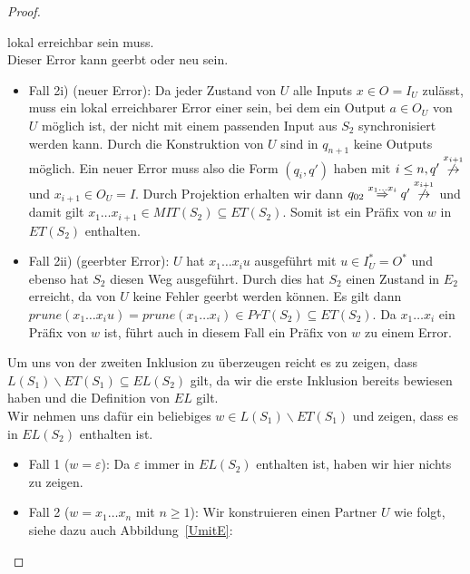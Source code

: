 \begin{proof}
\begin{itemize}
      lokal erreichbar sein muss.\\
      Dieser Error kann geerbt oder neu sein.\\
      \begin{itemize}
        \item Fall 2i) (neuer Error): Da jeder Zustand von $U$ alle Inputs $x\in
          O=I_U$ zulässt, muss ein lokal erreichbarer Error einer sein, bei dem
          ein Output $a\in O_U$ von $U$ möglich ist, der nicht mit einem
          passenden Input aus $S_2$ synchronisiert werden kann. Durch die
          Konstruktion von $U$ sind in $q_{n+1}$ keine Outputs möglich. Ein
          neuer Error muss also die Form $(q_i,q')$ haben mit $i\leq n, q'
          \overset{x_{i+1}}{\not{\hspace{-0.1cm}\rightarrow}}$ und $x_{i+1}\in
          O_U=I$. Durch Projektion erhalten wir dann $q_{02} \overset{x_1\dots
          x_i}{\Rightarrow} q'
          \overset{x_{i+1}}{\not{\hspace{-0.1cm}\rightarrow}}$ und damit gilt
          $x_1\dots x_{i+1}\in MIT(S_2)\subseteq ET(S_2)$. Somit ist ein Präfix
          von $w$ in $ET(S_2)$ enthalten.
        \item Fall 2ii) (geerbter Error): $U$ hat $x_1\dots x_i u$ ausgeführt
          mit $u\in I_U^*=O^*$ und ebenso hat $S_2$ diesen Weg ausgeführt.
          Durch dies hat $S_2$ einen Zustand in $E_2$ erreicht, da von $U$
          keine Fehler geerbt werden können. Es gilt dann $prune(x_1\dots
          x_iu)=prune(x_1\dots x_i)\in PrT(S_2)\subseteq ET(S_2)$. Da $x_1\dots
          x_i$ ein Präfix von $w$ ist, führt auch in diesem Fall ein Präfix von
          $w$ zu einem Error.
      \end{itemize}
  \end{itemize}
  Um uns von der zweiten Inklusion zu überzeugen reicht es zu zeigen, dass
  $L(S_1)\backslash ET(S_1)\subseteq EL(S_2)$ gilt, da wir die erste Inklusion
  bereits bewiesen haben und die Definition von $EL$ gilt.\\
  Wir nehmen uns dafür ein beliebiges $w\in L(S_1)\backslash ET(S_1)$ und
  zeigen, dass es in $EL(S_2)$ enthalten ist.
  \begin{itemize}
    \item Fall 1 ($w=\varepsilon$): Da $\varepsilon$ immer in $EL(S_2)$
      enthalten ist, haben wir hier nichts zu zeigen.
    \item Fall 2 ($w=x_1\dots x_n$ mit $n\geq 1$): Wir konstruieren einen
      Partner $U$ wie folgt, siehe dazu auch Abbildung~\ref{UmitE}:

\end{itemize}
\end{proof}
